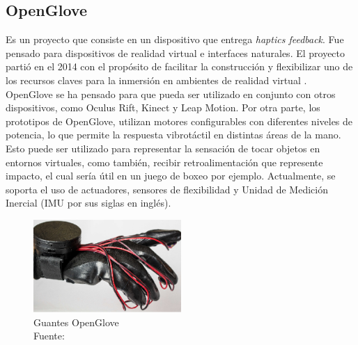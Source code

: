 \subsection{OpenGlove}
	Es un proyecto que consiste en un dispositivo que entrega \textit{haptics feedback}. Fue pensado para dispositivos de realidad virtual e interfaces naturales. El proyecto partió en el 2014 con el propósito  de facilitar la construcción y flexibilizar uno de los recursos claves para la inmersión en ambientes de  realidad virtual \citep{openglove-info-page}. OpenGlove se ha pensado para que pueda ser utilizado en conjunto con otros dispositivos, como Oculus Rift, Kinect y Leap Motion. Por otra parte, los prototipos de OpenGlove, utilizan motores configurables con diferentes niveles de potencia, lo que permite la respuesta vibrotáctil en distintas áreas de la mano. Esto puede ser utilizado para representar la sensación de tocar objetos en entornos virtuales, como también, recibir retroalimentación que represente impacto, el cual sería útil en un juego de boxeo por ejemplo.   Actualmente, se soporta el uso de actuadores, sensores de flexibilidad y Unidad de Medición Inercial (IMU por sus siglas en inglés).
    
            
\begin{figure}[H]
  \begin{center} 
   	\includegraphics[width=0.5\textwidth]{images/fig-analisis-solucion/openglove.png} 
    \caption[Guantes OpenGlove]{Guantes OpenGlove \\Fuente: \cite{openglove-info-page}} 
    \label{fig:OpenGlove}
  \end{center}
\end{figure}

    

